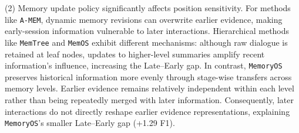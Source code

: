 (2) Memory update policy significantly affects position sensitivity. For methods like \texttt{A-MEM}, dynamic memory revisions can overwrite earlier evidence, making early-session information vulnerable to later interactions. Hierarchical methods like {\tt MemTree} and {\tt MemOS} exhibit different mechanisms: although raw dialogue is retained at leaf nodes, updates to higher-level summaries amplify recent information's influence, increasing the Late–Early gap. In contrast, {\tt MemoryOS} preserves historical information more evenly through stage-wise transfers across memory levels. Earlier evidence remains relatively independent within each level rather than being repeatedly merged with later information. Consequently, later interactions do not directly reshape earlier evidence representations, explaining {\tt MemoryOS}'s smaller Late–Early gap (+1.29 F1).









